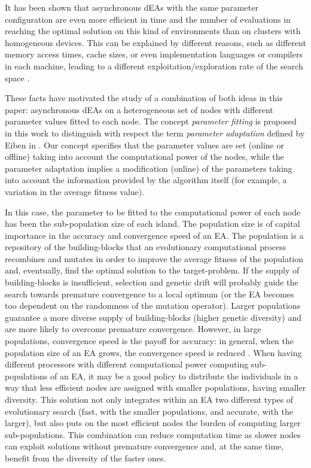 \documentclass[final,1p,times]{elsarticle}
\begin{document}
It  has  been shown that
\cite{HETEROGENEOUSHARD} asynchronous dEAs with the same parameter
configuration are even 
more efficient in time and the number of evaluations in reaching the optimal solution on this kind of environments  than on clusters with
homogeneous devices. This can be explained by different reasons, such
as different memory access times, cache sizes, 
or even implementation
languages or compilers in each machine, leading to a different
exploitation/exploration rate of the search space \cite{HETEROGENEOUSHARD}. 


These facts have motivated the study of a combination of both ideas in
this paper: asynchronous dEAs on a heterogeneous set of nodes with different
parameter values fitted to each node. The concept {\em parameter fitting} is proposed in this work to distinguish with respect the term {\em parameter adaptation} defined by Eiben in \cite{Eiben05Shared}. Our concept specifies that the parameter values are set (online or offline) taking into account the computational power of the nodes, while the parameter adaptation implies a modification (online) of the parameters taking into account the information provided by the algorithm itself (for example, a variation in the average fitness value).

In this case, the parameter to
be fitted to the computational power of each node has been the
sub-population size of each island. 
The population size is of capital importance in the accuracy and
convergence speed of an EA. The population is a repository of the
building-blocks that an evolutionary computational process recombines
and mutates in order to improve the average fitness of the population
and, eventually, find the optimal solution to the target-problem. If
the supply of building-blocks is insufficient, selection and genetic
drift will probably guide the search towards premature convergence to a
local optimum (or the EA becomes too dependent on the randomness of
the mutation operator). Larger populations guarantee a more diverse
supply of building-blocks (higher genetic diversity) and are more
likely to overcome premature convergence. However, in large
populations, convergence speed is the payoff for accuracy: in general,
when the population size of an EA grows, the convergence speed is
reduced \cite{Cantu02Multiple}. When having different processors with different computational
power computing sub-populations of an EA, it may be a good policy to
distribute the individuals in a way that less efficient nodes are
assigned with smaller populations, having smaller diversity. 
This solution not only integrates
within an EA two different types of evolutionary search (fast, with
the smaller populations, and accurate, with the larger), but also puts
on the most efficient nodes the burden of computing larger
sub-populations. This combination can reduce computation time
as slower nodes can exploit solutions without premature convergence and,
 at the same time, benefit from the diversity of the faster ones. 
\end{document}
